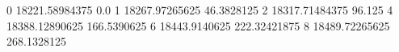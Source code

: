 0 18221.58984375 0.0
1 18267.97265625 46.3828125
2 18317.71484375 96.125
4 18388.12890625 166.5390625
6 18443.9140625 222.32421875
8 18489.72265625 268.1328125

